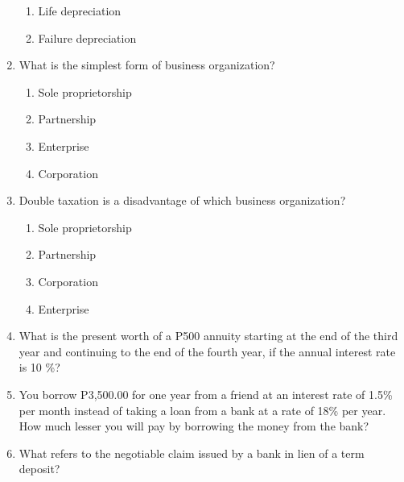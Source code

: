 \documentclass[11pt,a4paper]{article}
\begin{document}
\begin{enumerate}
\begin{enumerate}[label=\Alph*.]
\item{Life depreciation}
\item{Failure depreciation}
\end{enumerate}
\item{What is the simplest form of business organization?}
\begin{enumerate}[label=\Alph*.]
\item{Sole proprietorship}
\item{Partnership}
\item{Enterprise}
\item{Corporation}
\end{enumerate}
\item{Double taxation is a disadvantage of which business organization?}
\begin{enumerate}[label=\Alph*.]
\item{Sole proprietorship}
\item{Partnership}
\item{Corporation}
\item{Enterprise}
\end{enumerate}
\item{What is the present worth of a P500 annuity starting at the end of the third year and continuing to the end of the fourth year, if the annual interest rate is 10 \%?}
\\
\item{You borrow P3,500.00 for one year from a friend at an interest rate of 1.5\% per month instead of taking a loan from a bank at a rate of 18\% per year. How much lesser you will pay by borrowing the money from the bank?}
\\
\item{What refers to the negotiable claim issued by a bank in lien of a term deposit?}
\begin{enumerate}[label=\Alph*.]

\end{enumerate}
\end{enumerate}
\end{document}
